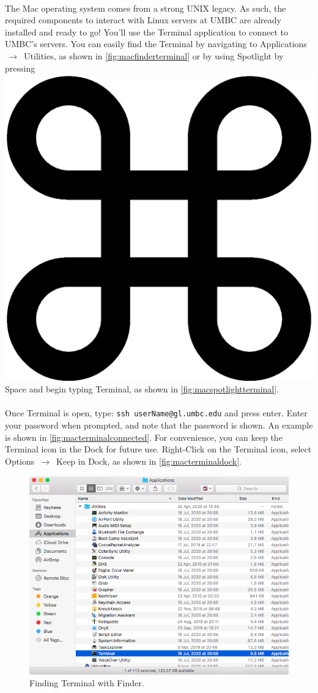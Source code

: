 \documentclass[letter,11pt]{article}
\begin{document}
\paragraph{}The Mac operating system comes from a strong UNIX legacy. As such, the required components to interact with Linux servers at UMBC are already installed and ready to go! You'll use the Terminal application to connect to UMBC's servers. You can easily find the Terminal by navigating to Applications $\,\to\,$ Utilities, as shown in \autoref{fig:macfinderterminal} or by using Spotlight by pressing \includegraphics[height=.75em]{Images/command.eps} Space and begin typing Terminal, as shown in \autoref{fig:macspotlightterminal}.

\paragraph{}Once Terminal is open, type: \texttt{ssh userName@gl.umbc.edu} and press enter. Enter your password when prompted, and note that the password is shown. An example is shown in \autoref{fig:macterminalconnected}. For convenience, you can keep the Terminal icon in the Dock for future use. Right-Click on the Terminal icon, select Options $\,\to\,$ Keep in Dock, as shown in \autoref{fig:macterminaldock}.

\begin{figure}
\centering
\includegraphics[scale=0.6]{Images/finder_terminal.png}
\caption{Finding Terminal with Finder.}
\label{fig:macfinderterminal}
\end{figure}
\end{document}
